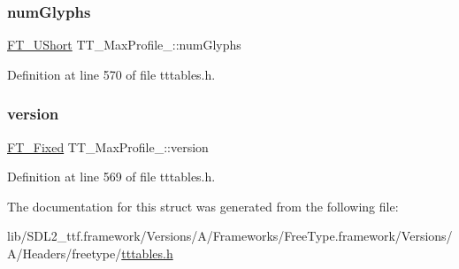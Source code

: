 \subsubsection{\texorpdfstring{numGlyphs}{numGlyphs}}
{\footnotesize\ttfamily \mbox{\hyperlink{fttypes_8h_a937f6c17cf5ffd09086d8610c37b9f58}{F\+T\+\_\+\+U\+Short}} T\+T\+\_\+\+Max\+Profile\+\_\+\+::num\+Glyphs}



Definition at line 570 of file tttables.\+h.

\mbox{\label{struct_t_t___max_profile___a59618f7c572dadc58e883d32dea46380}} 
\subsubsection{\texorpdfstring{version}{version}}
{\footnotesize\ttfamily \mbox{\hyperlink{fttypes_8h_a5f5a679cc09f758efdd0d1c5feed3c3d}{F\+T\+\_\+\+Fixed}} T\+T\+\_\+\+Max\+Profile\+\_\+\+::version}



Definition at line 569 of file tttables.\+h.



The documentation for this struct was generated from the following file\+:\begin{DoxyCompactItemize}
\item 
lib/\+S\+D\+L2\+\_\+ttf.\+framework/\+Versions/\+A/\+Frameworks/\+Free\+Type.\+framework/\+Versions/\+A/\+Headers/freetype/\mbox{\hyperlink{tttables_8h}{tttables.\+h}}\end{DoxyCompactItemize}
